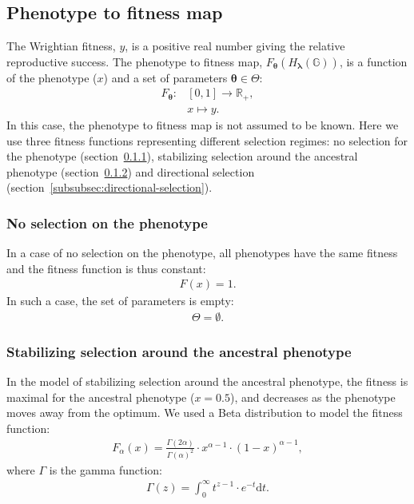 \documentclass{article}
\newcommand{\der}{\text{d}}
\newcommand{\Multiply}{\cdot}
\newcommand{\Geno}{\mathbb{G}}
\newcommand{\PhenoDef}{x}
\newcommand{\PhenoParam}{\bm{\lambda}}
\newcommand{\GenoPhenoMap}{H_{\PhenoParam}}
\newcommand{\Pheno}{\GenoPhenoMap\left(\Geno\right)}
\newcommand{\FitParam}{\bm{\theta}}
\newcommand{\FitParamSet}{\Theta}
\newcommand{\PhenoFitMapDef}{F}
\newcommand{\PhenoFitMap}{\PhenoFitMapDef_{\FitParam}}
\newcommand{\FitDef}{y}
\newcommand{\Fit}{\PhenoFitMap\left(\Pheno\right)}
\begin{document}
    \subsection{Phenotype to fitness map}\label{subsec:phenotype-to-fitness-map}
    The Wrightian fitness, $\FitDef$, is a positive real number giving the relative reproductive success.
    The phenotype to fitness map, $\Fit$, is a function of the phenotype ($\PhenoDef$) and a set of parameters $\FitParam \in \FitParamSet$:
    \begin{align}
        \PhenoFitMap : & \left[ 0, 1 \right] \to \mathbb{R}_{+}, \\
        & \PhenoDef \mapsto \FitDef.
    \end{align}
    In this case, the phenotype to fitness map is not assumed to be known.
    Here we use three fitness functions representing different selection regimes: no selection for the phenotype (section~\ref{subsubsec:no-selection}), stabilizing selection around the ancestral phenotype (section~\ref{subsubsec:stabilizing-selection}) and directional selection (section~\ref{subsubsec:directional-selection}).

    \subsubsection{No selection on the phenotype}
    \label{subsubsec:no-selection}
    In a case of no selection on the phenotype, all phenotypes have the same fitness and the fitness function is thus constant:
    \begin{align}
        \PhenoFitMapDef (\PhenoDef) = 1.
    \end{align}
    In such a case, the set of parameters is empty:
    \begin{gather}
        \FitParamSet = \emptyset.
    \end{gather}

    \subsubsection{Stabilizing selection around the ancestral phenotype}
    \label{subsubsec:stabilizing-selection}
    In the model of stabilizing selection around the ancestral phenotype, the fitness is maximal for the ancestral phenotype ($\PhenoDef = 0.5$), and decreases as the phenotype moves away from the optimum.
    We used a Beta distribution to model the fitness function:
    \begin{align}
        \PhenoFitMapDef_{\alpha} (\PhenoDef) = \frac {\Gamma (2 \alpha )}{\Gamma (\alpha )^2} \Multiply \PhenoDef^{\alpha -1} \Multiply (1-\PhenoDef)^{\alpha -1},
    \end{align}
    where $\Gamma$ is the gamma function:
    \begin{align}
        \Gamma (z)=\int _{0}^{\infty }t^{z-1} \Multiply e^{-t} \der t.
    \end{align}
\end{document}
